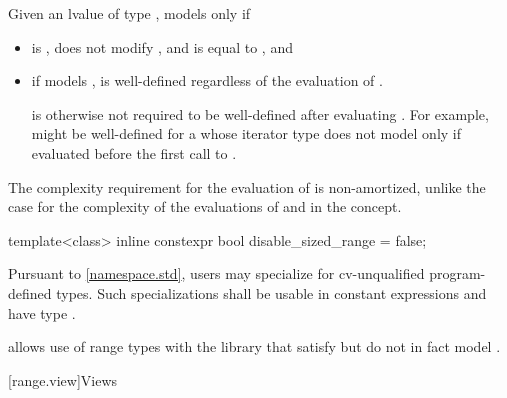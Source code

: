\begin{itemdescr}
\pnum
Given an lvalue  of type , 
models  only if
\begin{itemize}
\item {} is , does not modify ,
and is equal to , and

\item if  models ,
 is well-defined regardless of the evaluation of
.
\begin{note}
 is otherwise not required to be
well-defined after evaluating .
For example,  might be well-defined
for a  whose iterator type
does not model 
only if evaluated before the first call to .
\end{note}
\end{itemize}

\pnum
\begin{note}
The complexity requirement for the evaluation of 
is non-amortized, unlike the case for the complexity of the evaluations of
 and  in the  concept.
\end{note}
\end{itemdescr}

%
\begin{itemdecl}
template<class>
  inline constexpr bool disable_sized_range = false;
\end{itemdecl}

\begin{itemdescr}
\pnum
\remarks
Pursuant to \ref{namespace.std},
users may specialize 
for cv-unqualified program-defined types.
Such specializations shall
be usable in constant expressions and
have type .

\pnum
\begin{note}
 allows use of range types with the library
that satisfy but do not in fact model .
\end{note}
\end{itemdescr}

[range.view]{Views}

